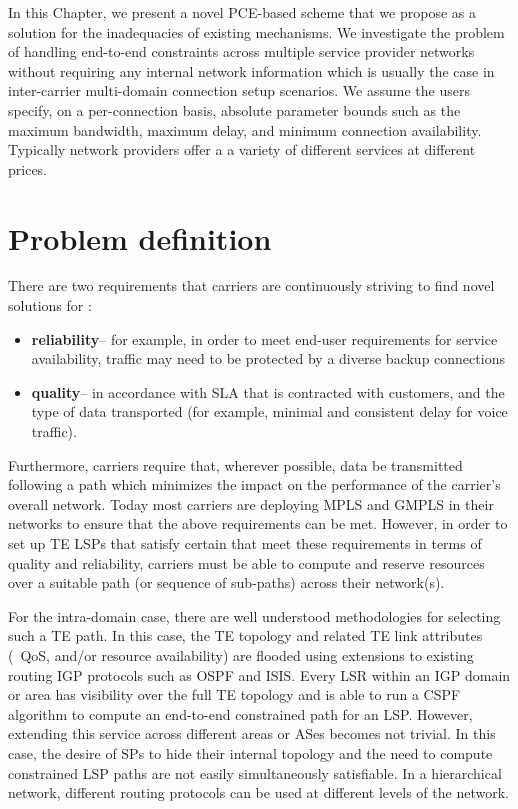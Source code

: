 In this Chapter, we present a novel PCE-based scheme that we propose as a solution for the inadequacies of existing mechanisms. We investigate the problem of handling end-to-end constraints across multiple service provider networks without requiring any internal network information which is usually the case in inter-carrier multi-domain connection setup scenarios. We assume the users specify, on a per-connection basis, absolute parameter bounds such as the maximum bandwidth, maximum delay, and minimum connection availability. Typically network providers offer a a variety of different services at different prices.

\section{Problem definition}
There are two requirements that carriers are continuously striving to find novel solutions for :
\begin{itemize}
\item \textbf{reliability}-- for example, in order to meet end-user requirements for service availability, traffic may need to be protected by a diverse backup connections
\item \textbf{quality}-- in accordance with SLA that is contracted with  customers, and the type of data transported (for example, minimal and consistent delay for voice traffic).
\end{itemize}

Furthermore, carriers require that, wherever possible, data be transmitted following a path which minimizes the impact on the performance of the carrier's overall network. Today most carriers are deploying MPLS and GMPLS in their networks to ensure that the above requirements can be met. However, in order to set up TE LSPs that satisfy certain that meet these requirements in terms of quality and reliability, carriers must be able to compute and reserve resources over a suitable path (or sequence of sub-paths) across their network(s).

For the intra-domain case, there are well understood methodologies for selecting such a TE path. In this case, the TE topology and related TE link attributes (\eg\ QoS, and/or resource availability) are flooded using extensions to existing routing IGP protocols such as OSPF and ISIS. Every LSR within an IGP domain or area has visibility over the full TE topology and is able to run a CSPF algorithm to compute an end-to-end constrained path for an LSP.
However, extending this service across different areas or ASes becomes not trivial. In this case, the desire of SPs to hide their internal topology and the need to compute constrained LSP paths are not easily simultaneously satisfiable. In a hierarchical network, different routing protocols can be used at different levels of the network.

